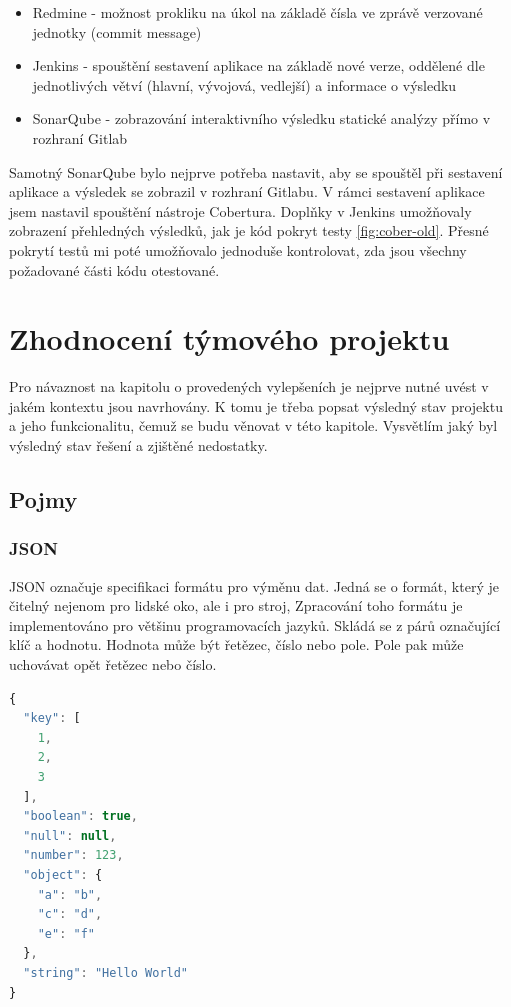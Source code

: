 \documentclass[thesis=B,czech]{FITthesis}[2012/06/26]
\begin{document}
\begin{itemize}
\item Redmine - možnost prokliku na úkol na základě čísla ve zprávě verzované jednotky (commit message)
\item Jenkins - spouštění sestavení aplikace na základě nové verze, oddělené dle jednotlivých větví (hlavní, vývojová, vedlejší) a
				informace o výsledku
\item SonarQube - zobrazování interaktivního výsledku statické analýzy přímo v rozhraní Gitlab
\end{itemize}

Samotný SonarQube bylo nejprve potřeba nastavit, aby se spouštěl při sestavení aplikace a výsledek se zobrazil v rozhraní
Gitlabu. V rámci sestavení aplikace jsem nastavil spouštění nástroje Cobertura.
Doplňky v Jenkins umožňovaly zobrazení přehledných výsledků, jak je kód pokryt testy \ref{fig:cober-old}. Přesné pokrytí testů mi poté umožňovalo 
jednoduše kontrolovat, zda jsou všechny požadované části kódu otestované.


\chapter{Zhodnocení týmového projektu}
Pro návaznost na kapitolu o provedených vylepšeních je nejprve nutné uvést v jakém kontextu jsou navrhovány. K tomu je třeba
popsat výsledný stav projektu a jeho funkcionalitu, čemuž se budu věnovat v této kapitole. Vysvětlím jaký byl výsledný stav
řešení a zjištěné nedostatky.

\section{Pojmy}

\subsection{JSON}
JSON označuje specifikaci formátu pro výměnu dat\cite{JSON}. Jedná se o formát, který je čitelný nejenom pro lidské oko, ale i pro stroj\cite{JSON},
Zpracování toho formátu je implementováno pro většinu programovacích jazyků\cite{JSON-impl}. Skládá se z párů označující
klíč a hodnotu. Hodnota může být řetězec, číslo nebo pole. Pole pak může uchovávat opět řetězec nebo číslo. \cite{JSON}

\begin{lstlisting}[language=JavaScript, caption={Ukázka formátu JSON}]
{
  "key": [
    1,
    2,
    3
  ],
  "boolean": true,
  "null": null,
  "number": 123,
  "object": {
    "a": "b",
    "c": "d",
    "e": "f"
  },
  "string": "Hello World"
}
\end{lstlisting}
\end{document}
